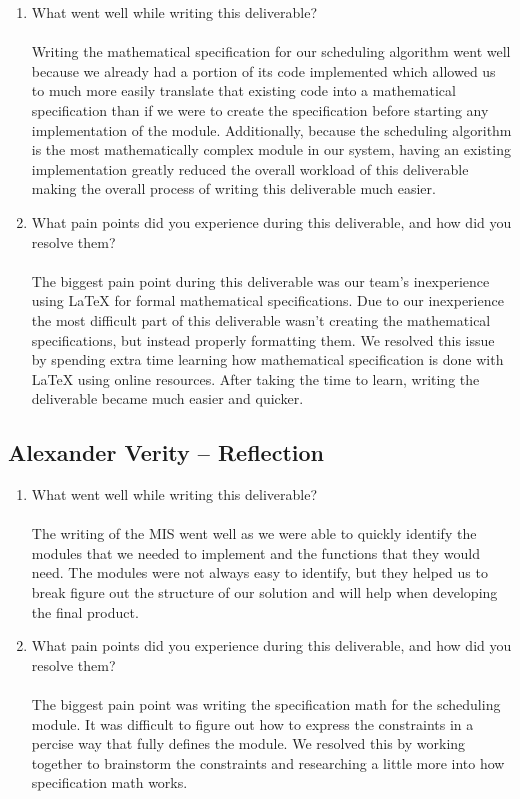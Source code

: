 \documentclass[12pt, titlepage]{article}
\begin{document}
\begin{enumerate}
  \item What went well while writing this deliverable?\\\\
  Writing the mathematical specification for our scheduling algorithm went well
  because we already had a portion of its code implemented which allowed us to
  much more easily translate that existing code into a mathematical 
  specification than if we were to create the specification before starting
  any implementation of the module. Additionally, because the scheduling 
  algorithm is the most mathematically complex module in our system, 
  having an existing implementation greatly reduced the overall workload of 
  this deliverable making the overall process of writing this deliverable much
  easier.
    
  \item What pain points did you experience during this deliverable, and how
  did you resolve them?\\\\
  The biggest pain point during this deliverable was our team's inexperience
  using LaTeX for formal mathematical specifications. Due to our inexperience 
  the most difficult part of this deliverable wasn't creating the mathematical
  specifications, but instead properly formatting them. We resolved this issue 
  by spending extra time learning how mathematical specification is done with 
  LaTeX using online resources. After taking the time to learn, writing the 
  deliverable became much easier and quicker.
  
\end{enumerate}

\subsection*{Alexander Verity -- Reflection}

\begin{enumerate}
  \item What went well while writing this deliverable?\\\\
  The writing of the MIS went well as we were able to quickly identify the
  modules that we needed to implement and the functions that they would need.
  The modules were not always easy to identify, but they helped us to break
  figure out the structure of our solution and will help when developing the
  final product.

  \item What pain points did you experience during this deliverable, and how
  did you resolve them?\\\\
  The biggest pain point was writing the specification math for the scheduling
  module. It was difficult to figure out how to express the constraints in a
  percise way that fully defines the module. We resolved this by working
  together to brainstorm the constraints and researching a little more into
  how specification math works.
\end{enumerate}
\end{document}

